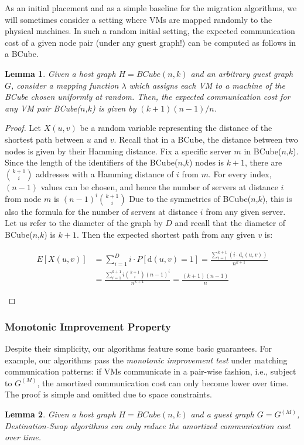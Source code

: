 \documentclass[conference]{IEEEtran}
\newtheorem{lemma}{Lemma}
\newtheorem{proof}{Proof}
\newcommand{\dist}{\text{d}}
\def\BC#1#2{BCube(#1,#2)}
\begin{document}
As an initial placement and as a simple baseline for the migration algorithms, we
will sometimes consider a setting where VMs are mapped randomly to the physical machines.
In such a random initial setting, the expected communication cost of a given node pair (under any guest graph!) can
be computed as follows in a BCube.
\begin{lemma}\label{lemma:No-Algo}
Given a host graph $H=\BC{n}{k}$ and an arbitrary guest graph $G$, consider a mapping function $\lambda$ which assigns each VM to a machine of the BCube chosen uniformly at random.
Then, the expected communication cost for any VM pair \BC{$n$}{$k$} is given by
$(k+1)(n-1)/n$.
\end{lemma}
\begin{proof}
Let $X(u,v)$ be a random variable representing the distance of the shortest path between $u$ and $v$.
Recall that in a BCube, the distance between two nodes is given by their Hamming distance.
Fix a specific server $m$ in \BC{$n$}{$k$}. Since the length of the identifiers of the \BC{$n$}{$k$} nodes is $k+1$,
there are $k+1\choose i$
addresses with a Hamming distance of $i$ from $m$.
For every index, $(n-1)$ values can be chosen, and hence the number of servers at distance $i$ from node $m$ is
$(n-1)^i {k+1 \choose i}$
Due to the symmetries of \BC{$n$}{$k$}, this is also the formula for the number of servers at distance $i$ from any given server.
Let us refer to the diameter of the graph by $D$ and recall that
 the diameter of \BC{$n$}{$k$} is $k+1$. Then the expected shortest path from any given $v$ is:

 \begin{footnotesize}
\begin {align*}
 E[X(u,v)] &= \sum\limits_{i=1}^{D} i\cdot P[\dist(u,v) = 1]
= \frac{\sum\limits_{i=1}^{k+1} (i\cdot\dist_i(u,v))}{n^{k+1}} \\
&= \frac{\sum_{i=1}^{k+1} i{k+1\choose i}(n-1)^i}{n^{k+1}}
= \frac{(k+1)(n-1)}{n}
\end {align*}
 \end{footnotesize}
\end{proof}

\subsubsection{Monotonic Improvement Property}

Despite their simplicity, our algorithms feature some basic guarantees.
For example, our algorithms pass the \emph{monotonic improvement test} under
matching communication patterns: if VMs communicate in a pair-wise fashion,
i.e., subject to $G^{(M)}$, the amortized communication cost can only become lower over time.
The proof is simple and omitted due to space constraints.
\begin{lemma}\label{lemma:Matching}
Given a host graph $H = \BC{n}{k}$ and a guest graph $G = G^{(M)}$,
\emph{Destination-Swap}
algorithms can only reduce the amortized communication cost over time.
\end{lemma}
\end{document}
